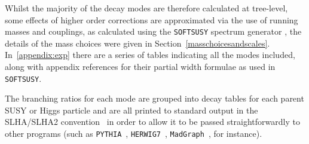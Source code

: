 \documentclass[final,3p,times,pdflatex]{elsarticle}
\def\code#1{{\tt #1}}
\begin{document}
Whilst the majority of the decay modes are therefore calculated at tree-level,
some effects of higher order corrections are approximated via the use of
running masses and couplings, as calculated using the {\tt SOFTSUSY} spectrum
generator \cite{Allanach:2001kg}, the details of the mass choices were given
in Section~\ref{masschoicesandscales}. In~\ref{appendix:exp} there are a
series of tables indicating all the modes included, along with appendix references for
their partial width formulae as used in {\tt SOFTSUSY}.  

The branching ratios for each mode are grouped into decay tables for each
parent SUSY or Higgs particle and are all printed to standard
output in the SLHA/SLHA2 convention~\cite{Skands:2003cj,Allanach:2008qq} in
order to allow it to be passed straightforwardly to other programs
(such as {\tt PYTHIA}~\cite{Sjostrand:2014zea},
\code{HERWIG7}~\cite{Bahr:2008pv}, {\tt MadGraph}~\cite{Alwall:2014}, for
instance).  
\end{document}
